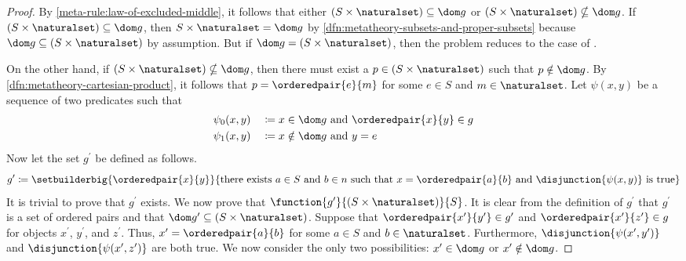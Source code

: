 \begin{proof}
    By \cref{meta-rule:law-of-excluded-middle}, it follows that either \( \mleft( S \times \naturalset \mright) \subseteq \dom g  \)
    or \( \mleft( S \times \naturalset \mright) \nsubseteq \dom g \).
    If \( \mleft( S \times \naturalset \mright) \subseteq \dom g \), then \( S \times \naturalset = \dom g \) by \cref{dfn:metatheory-subsets-and-proper-subsets}
    because \( \dom g \subseteq \mleft( S \times \naturalset \mright) \) by assumption.
    But if \( \dom g = \mleft( S \times \naturalset \mright) \), then the problem reduces to the case of .

    \vspace{0.3cm}
    \noindent
    On the other hand, if \( \mleft( S \times \naturalset \mright) \nsubseteq \dom g \), then there must exist a \( p \in \mleft( S \times \naturalset \mright) \) such that
    \( p \notin \dom g \). By \cref{dfn:metatheory-cartesian-product}, it follows that \( p = \orderedpair{e}{m} \) for some \( e \in S \) and \( m \in \naturalset \).
    Let \( \psi(x, y) \) be a sequence of two predicates such that
    \begin{alignat*}{2}
        &\psi_{0}(x, y) &&\coloneq x \in \dom g \ \text{and} \ \orderedpair{x}{y} \in g\\
        &\psi_{1}(x, y) &&\coloneq x \notin \dom g \ \text{and} \ y = e
    \end{alignat*}
    Now let the set \( g^{\prime} \) be defined as follows.
    \begin{equation*}
        g^{\prime} \coloneq \setbuilderbig{\orderedpair{x}{y}}{\text{there exists \( a \in S \) and \( b \in n \) such that \( x = \orderedpair{a}{b} \) and
        \( \disjunction{\psi(x, y)} \) is true}}
    \end{equation*}
    It is trivial to prove that \( g^{\prime} \) exists.
    We now prove that \( \function{g^{\prime}}{\mleft( S \times \naturalset \mright)}{S} \).
    It is clear from the definition of \( g^{\prime} \) that \( g^{\prime} \) is a set of ordered pairs and that
    \( \dom g^{\prime} \subseteq \mleft( S \times \naturalset \mright) \).
    Suppose that \( \orderedpair{x^{\prime}}{y^{\prime}} \in g^{\prime} \) and \( \orderedpair{x^{\prime}}{z^{\prime}} \in g \) for objects \( x^{\prime} \), \( y^{\prime} \),
    and \( z^{\prime} \).
    Thus, \( x^{\prime} = \orderedpair{a}{b} \) for some \( a \in S \) and \( b \in \naturalset \).
    Furthermore, \( \disjunction{\psi(x^{\prime}, y^{\prime})} \) and \( \disjunction{\psi(x^{\prime}, z^{\prime})} \) are both true.
    We now consider the only two possibilities: \( x^{\prime} \in \dom g \) or \( x^{\prime} \notin \dom g \).


\end{proof}

